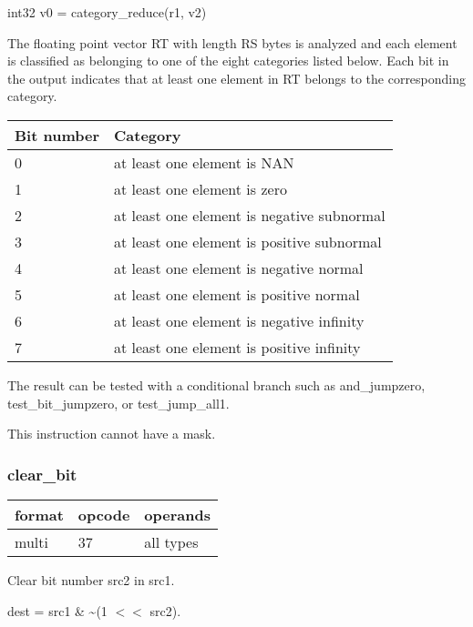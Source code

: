 \documentclass[forwardcom.tex]{subfiles}
\begin{document}
int32 v0 = category\_reduce(r1, v2)
\vspace{2mm}

The floating point vector RT with length RS bytes is analyzed and each element is classified as belonging to one of the eight categories listed below. Each bit in the output indicates that at least one element in RT belongs to the corresponding category.
\vspace{2mm}

\begin{tabular}{|p{24mm}|p{115mm}|}
\hline
\bfseries Bit number & \bfseries Category \\ \hline
0 & at least one element is NAN \\
1 & at least one element is zero \\
2 & at least one element is negative subnormal \\
3 & at least one element is positive subnormal \\
4 & at least one element is negative normal \\
5 & at least one element is positive normal \\
6 & at least one element is negative infinity \\
7 & at least one element is positive infinity \\
\hline
\end{tabular}
\vspace{2mm}

The result can be tested with a conditional branch such as and\_jumpzero, test\_bit\_jumpzero, or test\_jump\_all1.
\vspace{2mm}

This instruction cannot have a mask.

\subsubsection{clear\_bit}
\label{table:clearBitInstruction}
\begin{tabular}{|p{12mm}|p{12mm}|p{110mm}|}
\hline
\bfseries format & \bfseries opcode & \bfseries operands \\ \hline
multi & 37 & all types \\ \hline
\end{tabular}
\vspace{2mm}

Clear bit number src2 in src1.
\vspace{2mm}

dest = src1 \& \~{}(1 $<<$ src2).
\end{document}
